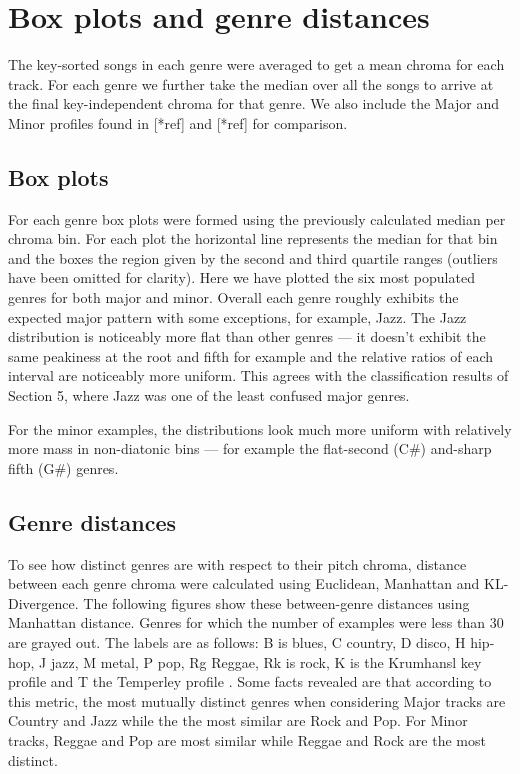 \documentclass{article}
\begin{document}
\section{Box plots and genre distances}
The key-sorted songs in each genre were averaged to get a mean chroma for each track. For each genre we further take the median over all the songs to arrive at the final key-independent chroma for that genre. We also include the Major and Minor profiles found in [*ref] and [*ref] for comparison.

\subsection{Box plots}
For each genre box plots were formed using the previously calculated median per chroma bin. For each plot the horizontal line represents the median for that bin and the boxes the region given by the second and third quartile ranges (outliers have been omitted for clarity). Here we have plotted the six most populated genres for both major and minor. Overall each genre roughly exhibits the expected major pattern with some exceptions, for example,  Jazz. The Jazz distribution is noticeably more flat than other genres --- it doesn't exhibit the same peakiness at the root and fifth for example and the relative ratios of each interval are noticeably more uniform. This agrees with the classification results of Section 5, where Jazz was one of the least confused major genres.

For the minor examples, the distributions look much more uniform with relatively more mass in non-diatonic bins --- for example the flat-second (C\#) and-sharp fifth (G\#) genres.


\subsection{Genre distances}
To see how distinct genres are with respect to their pitch chroma, distance between each genre chroma were calculated using Euclidean, Manhattan and KL-Divergence. The following figures show these between-genre distances using Manhattan distance. Genres for which the number of examples were less than 30 are grayed out. The labels are as follows: B is blues, C country, D disco, H hip-hop, J jazz, M metal, P pop, Rg Reggae, Rk is rock, K is the Krumhansl key profile and T the Temperley profile \cite{temperley_tonal_2007}. Some facts revealed are that according to this metric, the most mutually distinct genres when considering Major tracks are Country and Jazz while the the most similar are Rock and Pop. For Minor tracks, Reggae and Pop are most similar while Reggae and Rock are the most distinct.
\end{document}
